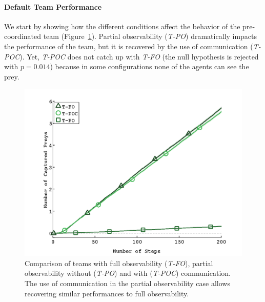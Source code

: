
\paragraph{Default Team Performance}

We start by showing how the different conditions affect the behavior of the pre-coordinated team (Figure~\ref{fig:cmpteam}). Partial observability (\emph{T-PO}) dramatically impacts the performance of the team, but it is recovered by the use of communication (\emph{T-POC}). Yet, \emph{T-POC} does not catch up with \emph{T-FO} (the null hypothesis is rejected with {\small$p=0.014$}) because in some configurations none of the agents can see the prey. %


\begin{figure}[htbp!]
  \centering
  \includegraphics[trim=2.6cm 0.4cm 2.7cm 1.8cm, clip=true, width=0.8\columnwidth]{plots/with_noise/teamComparaison.png}
  \caption{Comparison of teams with full observability (\emph{T-FO}), partial observability without (\emph{T-PO}) and with (\emph{T-POC}) communication. The use of communication in the partial observability case allows recovering similar performances to full observability.}
  \label{fig:cmpteam}
\end{figure}


